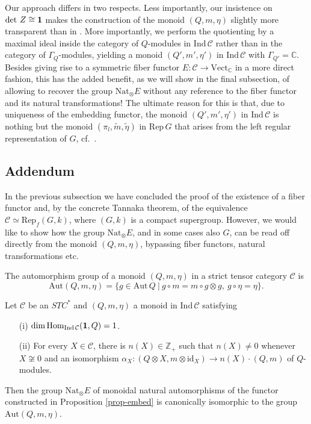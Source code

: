 \documentclass[11pt]{article}
\theoremstyle{definition}
\theoremstyle{definition}
\theoremstyle{remark}
\newcommand{\Vect}{\mathrm{Vect}}
\def\2#1{{\mathcal #1}}
\def\7#1{{\mathbb #1}}
\def\1#1{{\bf #1}}
\newcommand{\Hom}{\mathrm{Hom}}
\newcommand{\Aut}{\mathrm{Aut}}
\newcommand{\Rep}{\mathrm{Rep}}
\newcommand{\rarr}{\rightarrow}
\def\id{\mathrm{id}}
\newcommand{\Nat}{\mathrm{Nat}}
\begin{document}
Our approach differs in two respects. Less importantly, our insistence on $\det\,Z\cong\11$ makes the
construction of the monoid $(Q,m,\eta)$ slightly more transparent than in \cite{bichon}. More
importantly, we perform the quotienting by a maximal ideal inside the category of $Q$-modules 
in $\mathrm{Ind}\,\2C$ rather than in the category of $\Gamma_Q$-modules, yielding a monoid
$(Q',m',\eta')$ in $\mathrm{Ind}\,\2C$ with $\Gamma_{Q'}=\7C$. Besides giving rise to a symmetric
fiber functor $E:\2C\rarr\Vect_\7C$ in a more direct fashion, this has the added benefit, as we will
show in the final subsection, of allowing to recover the group $\Nat_\otimes E$ without any
reference to the fiber functor and its natural transformations! The ultimate reason for 
this is that, due to uniqueness of the embedding functor, the monoid $(Q',m',\eta')$ in
$\mathrm{Ind}\,\2C$ is nothing but the monoid $(\pi_l,\tilde{m},\tilde{\eta})$ in $\Rep\,G$ that
arises from the left regular representation of $G$, cf.\ \cite{MT}. 
\erem





\subsection{Addendum} \label{ss-add}
In the previous subsection we have concluded the proof of the existence of a fiber functor and, by
the concrete Tannaka theorem, of the equivalence $\2C\simeq\Rep_f(G,k)$, where $(G,k)$ is a compact
supergroup. However, we would like to show how the group $\mathrm{Nat}_\otimes E$, and in some cases
also $G$, can be read off directly from the monoid $(Q,m,\eta)$, bypassing fiber functors, natural
transformations etc. 

\bdefin 
The automorphism group of a monoid $(Q,m,\eta)$ in a strict tensor category $\2C$ is 
\[ \Aut(Q,m,\eta)=\{ g\in\Aut\,Q\ | \ g\circ m=m\circ g\otimes g, \ g\circ\eta=\eta\}. \]
\edefin

\bprop 
Let $\2C$ be an $STC^*$ and $(Q,m,\eta)$ a monoid in $\mathrm{Ind}\,\2C$ satisfying
\begin{itemize}
\item[(i)] $\dim\Hom_{\mathrm{Ind}\,\2C }(\11,Q)=1$.
\item[(ii)] For every $X\in\2C$, there is $n(X)\in\7Z_+$ such that $n(X)\ne 0$ whenever 
$X\not\cong 0$ and an isomorphism 
$\alpha_X:(Q\otimes X,m\otimes\id_X)\rarr n(X)\cdot(Q,m)$ of $Q$-modules.
\end{itemize}
Then the group $\Nat_\otimes E$ of monoidal natural automorphisms of the functor constructed in
Proposition \ref{prop-embed} is canonically isomorphic to the group $\Aut(Q,m,\eta)$.
\eprop
\end{document}
